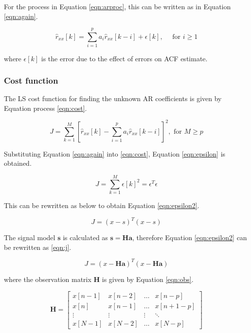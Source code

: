 \noindent
For the process in Equation \ref{eqn:arproc}, this can be written as in Equation \ref{eqn:again}.

\begin{equation}
\hat{r}_{x x}[k]=\sum_{i=1}^{p} a_{i} \hat{r}_{x x}[k-i]+\epsilon[k], \quad \text { for } i \geq 1
\label{eqn:again}
\end{equation}

\noindent where $\epsilon[k]$ is the error due to the effect of errors on ACF estimate.

\subsubsection{Cost function}

The LS cost function for finding the unknown AR coefficients is given by Equation process \ref{eqn:cost}.

\begin{equation}
J=\sum_{k=1}^{M}\left[\hat{r}_{x x}[k]-\sum_{i=1}^{p} a_{i} \hat{r}_{x x}[k-i]\right]^{2}, \text { for } M \geq p
\label{eqn:cost}
\end{equation}

\noindent
Substituting Equation \ref{eqn:again} into \ref{eqn:cost}, Equation \ref{eqn:epsilon} is obtained.

\begin{equation}
J=\sum_{k=1}^{M} \epsilon[k]^{2}=\epsilon^{T} \epsilon
\label{eqn:epsilon}
\end{equation}

\noindent
This can be rewritten as below to obtain Equation \ref{eqn:epsilon2}.

\begin{equation}
J = (x-s)^{T}(x-s)
\label{eqn:epsilon2}
\end{equation}

\noindent
The signal model $\boldsymbol{s}$ is calculated as $\boldsymbol{s = Ha}$, therefore Equation \ref{eqn:epsilon2} can be rewritten as \ref{eqn:j}.

\begin{equation}
J=(x-\mathbf{H a})^{T}(x-\mathbf{H a})
\label{eqn:j}
\end{equation}

\noindent
where the observation matrix $\boldsymbol{H}$ is given by Equation \ref{eqn:obs}.

\begin{equation}
\mathbf{H}=\left[\begin{array}{cccc}
x[n-1] & x[n-2] & \dots & x[n-p] \\
x[n] & x[n-1] & \dots & x[n+1-p] \\
\vdots & \vdots & \vdots & \ddots \\
x[N-1] & x[N-2] & \dots & x[N-p]
\end{array}\right]
\label{eqn:obs}
\end{equation}


